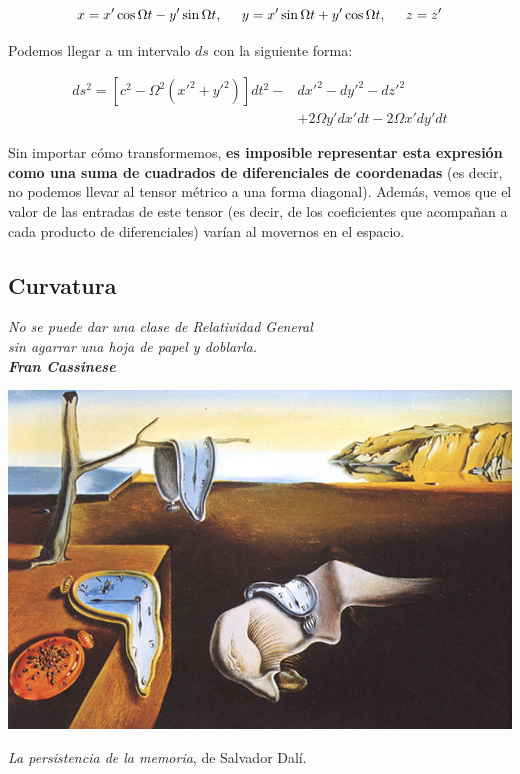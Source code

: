 $$x=x'\cos \Omega t-y'\sin \Omega t , \hspace{0.5cm} y=x'\sin \Omega t + y' \cos \Omega t, \hspace{0.5 cm}z=z'$$

Podemos llegar a un intervalo $ds$ con la siguiente forma\cite[][p.244]{landau2}:

\begin{equation}
\begin{split}
ds^2 = \left[c^2-\Omega^2(x'^2+y'^2) \right]dt^2-&dx'^2-dy'^2-dz'^2\\
&+2\Omega y' dx' dt-2\Omega x'dy'dt
\end{split}
\end{equation}

Sin importar cómo transformemos, \textbf{es imposible representar esta expresión como una suma de cuadrados de diferenciales de coordenadas} (es decir, no podemos llevar al tensor métrico a una forma diagonal). Además, vemos que el valor de las entradas de este tensor (es decir, de los coeficientes que acompañan a cada producto de diferenciales) varían al movernos en el espacio.

\subsection*{\textbf{Curvatura}}

\begin{flushright}
\textit{No se puede dar una clase de Relatividad General\\ sin agarrar una hoja de papel y doblarla.\\ \textbf{Fran Cassinese}}
\end{flushright}

\begin{marginfigure}
\captionsetup{type=figure}
    \centering
    \includegraphics[width=1.3\textwidth]{Im/persistenceofmemory1931.jpg}
    \caption{\textit{La persistencia de la memoria}, de Salvador Dalí.}
    \label{fig:sen}
\end{marginfigure}

